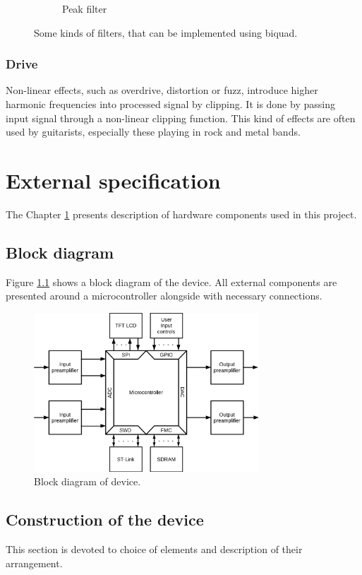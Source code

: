 \documentclass[a4paper,twoside,12pt]{book}
\begin{document}
\begin{figure}[H]
\begin{subfigure}[t]{0.4\textwidth}
        \label{fig:peak}
        \caption{Peak filter}
    \end{subfigure}
    \caption{Some kinds of filters, that can be implemented using biquad\cite{Zolzer2}.}
    \label{fig:biquad}
\end{figure}

\subsection{Drive}
Non-linear effects, such as overdrive, distortion or fuzz,
introduce higher harmonic frequencies into processed signal by clipping.
It is done by passing input signal through a non-linear clipping function.
This kind of effects are often used by guitarists,
especially these playing in rock and metal bands.


\chapter{External specification}\label{ch:external}
The Chapter \ref{ch:external} presents description of hardware components used in this project.

\section{Block diagram}
Figure \ref{fig:block} shows a block diagram of the device.
All external components are presented around a microcontroller
alongside with necessary connections.

\begin{figure}[H]
    \centering
    \includegraphics[width=0.75\textwidth]{images/Block}
    \caption{Block diagram of device.}
    \label{fig:block}
\end{figure}

\section{Construction of the device}
This section is devoted to choice of elements
and description of their arrangement.
\end{document}
